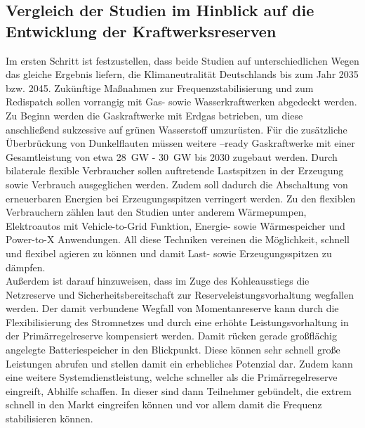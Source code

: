 	\subsection{Vergleich der Studien im Hinblick auf die Entwicklung der Kraftwerksreserven} \label{sect: Vergleich der Studien im Hinblick auf die Entwicklung der Kraftwerksreserven}
	
		Im ersten Schritt ist festzustellen, dass beide Studien auf unterschiedlichen Wegen das gleiche Ergebnis liefern, die Klimaneutralität Deutschlands bis zum Jahr 2035 bzw. 2045.
		Zukünftige Maßnahmen zur Frequenzstabilisierung und zum Redispatch sollen vorrangig mit Gas- sowie Wasserkraftwerken abgedeckt werden.
		Zu Beginn werden die Gaskraftwerke mit Erdgas betrieben, um diese anschließend sukzessive auf grünen Wasserstoff umzurüsten.
		Für die zusätzliche Überbrückung von Dunkelflauten müssen weitere \Htwo--ready Gaskraftwerke mit einer Gesamtleistung von etwa \SI{28}{\giga\watt} - \SI{30}{\giga\watt} bis 2030 zugebaut werden.
		Durch bilaterale flexible Verbraucher sollen auftretende Lastspitzen in der Erzeugung sowie Verbrauch ausgeglichen werden.
		Zudem soll dadurch die Abschaltung von erneuerbaren Energien bei Erzeugungsspitzen verringert werden.
		Zu den flexiblen Verbrauchern zählen laut den Studien unter anderem Wärmepumpen, Elektroautos mit Vehicle-to-Grid Funktion, Energie- sowie Wärmespeicher und Power-to-X Anwendungen.
		All diese Techniken vereinen die Möglichkeit, schnell und flexibel agieren zu können und damit Last- sowie Erzeugungsspitzen zu dämpfen. \\
		
		Außerdem ist darauf hinzuweisen, dass im Zuge des Kohleausstiegs die Netzreserve und Sicherheitsbereitschaft zur Reserveleistungsvorhaltung wegfallen werden.
		Der damit verbundene Wegfall von Momentanreserve kann durch die Flexibilisierung des Stromnetzes und durch eine erhöhte Leistungsvorhaltung in der Primärregelreserve kompensiert werden.
		Damit rücken gerade großflächig angelegte Batteriespeicher in den Blickpunkt.
		Diese können sehr schnell große Leistungen abrufen und stellen damit ein erhebliches Potenzial dar. 
		Zudem kann eine weitere Systemdienstleistung, welche schneller als die Primärregelreserve eingreift, Abhilfe  schaffen.
		In dieser sind dann Teilnehmer gebündelt, die extrem schnell in den Markt eingreifen können und vor allem damit die Frequenz stabilisieren können. \\
		
